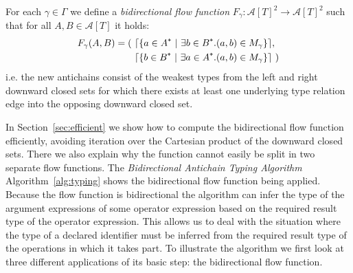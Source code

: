 \documentclass{sigplanconf}
\newcommand{\concept}[1]{\emph{#1}}
\newcommand{\mc}[1]{\mathcal{#1}}
\newcommand{\mt}[1]{\text{\tt #1}}
\begin{document}
\begin{definition}\label{def:flow}
For each $\gamma \in \Gamma$ we define a \concept{bidirectional flow
  function} $F_\gamma : \mc{A}[T]^2 \to \mc{A}[T]^2$ such that for all
$A, B \in \mc{A}[T]$ it holds:
\begin{align*}
F_\gamma( A, B ) = ( \ 
& \lceil \{ a \in A^\mt{+}\ |\ \exists b \in B^\mt{+} . (a, b) \in M_\gamma
\} \rceil, \\
& \lceil \{ b \in B^\mt{+}\ |\ \exists a \in A^\mt{+} . (a, b) \in M_\gamma
\} \rceil\ )
\end{align*}
i.e. the new antichains consist of the weakest types from the left and
right downward closed sets for which there exists at least one
underlying type relation edge into the opposing downward closed set.
\end{definition}

In Section~\ref{sec:efficient} we show how to compute the
bidirectional flow function efficiently, avoiding iteration over the
Cartesian product of the downward closed sets. There we also explain
why the function cannot easily be split in two separate flow
functions.
The \concept{Bidirectional Antichain Typing Algorithm}
Algorithm~\ref{alg:typing} shows the bidirectional flow function being
applied.
Because the flow function is bidirectional the algorithm can infer the
type of the argument expressions of some operator expression based on
the required result type of the operator expression. This allows us to
deal with the situation where the type of a declared identifier must
be inferred from the required result type of the operations in which it
takes part.
To illustrate the algorithm we first look at three different
applications of its basic step: the bidirectional flow function.
\end{document}
